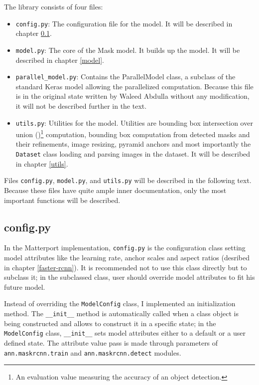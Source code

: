 The library consists of four files:
\begin{itemize}
	 \item \verb|config.py|: The configuration file for the model. It will be described in chapter \ref{config}.
	 \item \verb|model.py|: The core of the Mask  model. It builds up the model. It will be described in chapter \ref{model}.
	 \item \verb|parallel_model.py|: Contains the ParallelModel class, a subclass of the standard Keras model allowing the parallelized computation. Because this file is in the original state written by Waleed Abdulla without any modification, it will not be described further in the text.
	 \item \verb|utils.py|: Utilities for the model. Utilities are bounding box intersection over union ()\footnote{An evaluation value measuring the accuracy of an object detection.} computation, bounding box computation from detected masks and their refinements, image resizing, pyramid anchors and most importantly the \verb|Dataset| class loading and parsing images in the dataset. It will be described in chapter \ref{utils}.
\end{itemize}

Files \verb|config.py|, \verb|model.py|, and \verb|utils.py| will be described in the following text. Because these files have quite ample inner documentation, only the most important functions will be described.

\subsection{config.py}
\label{config}

In the Matterport implementation, \verb|config.py| is the configuration class setting model attributes like the learning rate,  anchor scales and aspect ratios (desribed in chapter \ref{faster-rcnn}). It is recommended not to use this class directly but to subclass it; in the subclassed class, user should override model attributes to fit his future model.

Instead of overriding the \verb|ModelConfig| class, I implemented an initialization method. The \verb|__init__| method is automatically called when a class object is being constructed and allows to construct it in a specific state; in the \verb|ModelConfig| class, \verb|__init__| sets model attributes either to a default or a user defined state. The attribute value pass is made through parameters of \verb|ann.maskrcnn.train| and \verb|ann.maskrcnn.detect| modules.

